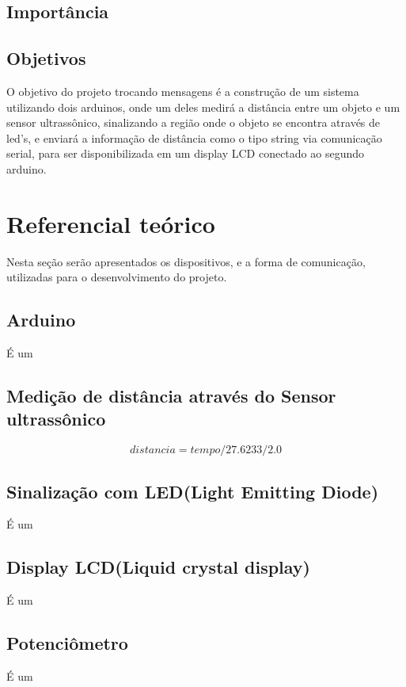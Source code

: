 \documentclass[conference]{IEEEtran}
\begin{document}
\subsection{Importância}

\subsection{Objetivos}
O objetivo do projeto trocando mensagens é a construção de um sistema utilizando dois arduinos,
onde um deles medirá a distância entre um objeto e um sensor ultrassônico, sinalizando a região onde o objeto se encontra através de led's,
e enviará a informação de distância como o tipo string via comunicação serial, para ser disponibilizada em um display LCD conectado ao segundo arduino.

\section{Referencial teórico}
Nesta seção serão apresentados os dispositivos, e a forma de comunicação, utilizadas para o desenvolvimento do projeto.
\subsection{Arduino}
É um \cite{cavalcante2011}

\subsection{Medição de distância através do Sensor ultrassônico}
\begin{equation}
    distancia = tempo / 27.6233 / 2.0 \label{eq}
\end{equation}

\subsection{Sinalização com LED(Light Emitting Diode)}
É um \cite{marteleto2011}

\subsection{Display LCD(Liquid crystal display)}
É um \cite{barbacena1996display}

\subsection{Potenciômetro}
É um \cite{patsko2006}
\end{document}
